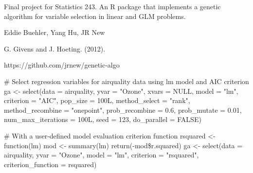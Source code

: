 %
\begin{Description}\relax
Final project for Statistics 243. An R package that implements a genetic algorithm for variable selection in linear and GLM problems.
\end{Description}
%
\begin{Details}\relax

\end{Details}
%
\begin{Author}\relax
Eddie Buehler, Yang Hu, JR New
\end{Author}
%
\begin{References}\relax
G. Givens and J. Hoeting.  (2012).
\end{References}
%
\begin{SeeAlso}\relax
https://github.com/jrnew/genetic-algo
\end{SeeAlso}
%
\begin{Examples}
\begin{ExampleCode}
# Select regression variables for airquality data using lm model and AIC criterion
ga <- select(data = airquality,
             yvar = "Ozone",
             xvars = NULL,
             model = "lm",
             criterion = "AIC",
             pop_size = 100L,
             method_select = "rank",
             method_recombine = "onepoint",
             prob_recombine = 0.6,
             prob_mutate = 0.01,
             num_max_iterations = 100L,
             seed = 123,
             do_parallel = FALSE)

# With a user-defined model evaluation criterion function
rsquared <- function(lm) {
  mod <- summary(lm)
  return(-mod\$r.squared)
}
ga <- select(data = airquality,
             yvar = "Ozone",
             model = "lm",
             criterion = "rsquared",
             criterion_function = rsquared)
\end{ExampleCode}
\end{Examples}
